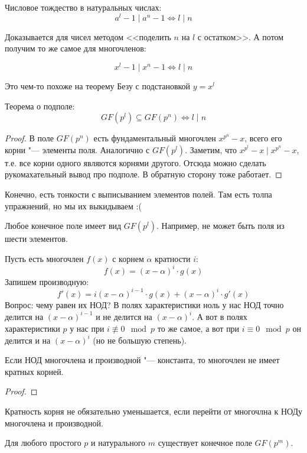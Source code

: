 \begin{lemma}
	Числовое тождество в натуральных числах:
	\[
	a^l - 1 \mid a^n - 1 \iff l \mid n
	\]
\end{lemma}
Доказывается для чисел методом <<поделить $n$ на $l$ с остатком>>.
А потом получим то же самое для многочленов:
\begin{lemma}
	\[
	x^l - 1 \mid x^n - 1 \iff l \mid n
	\]
\end{lemma}
\begin{Rem}
	Это чем-то похоже на теорему Безу с подстановкой $y=x^l$
\end{Rem}

\begin{theorem}
	Теорема о подполе:
	\[
	GF(p^l) \subseteq GF(p^n) \iff l \mid n
	\]
\end{theorem}
\begin{proof}
В поле $GF(p^n)$ есть фундаментальный многочлен $x^{p^n}-x$,
всего его корни "--- элементы поля.
Аналогично с $GF(p^l)$.
Заметим, что $x^{p^l}-x \mid x^{p^n}-x$, т.е. все корни
одного являются корнями другого.
Отсюда можно сделать рукомахательный вывод про подполе.
В обратную сторону тоже работает.
\end{proof}
\begin{Rem}
Конечно, есть тонкости с выписыванием элементов полей.
Там есть толпа упражнений, но мы их выкидываем :(
\end{Rem}

\begin{lemma}
	Любое конечное поле имеет вид $GF(p^l)$.
	Например, не может быть поля из шести элементов.
\end{lemma}

Пусть есть многочлен $f(x)$ с корнем $\alpha$ кратности $i$:
\[
	f(x) = (x - \alpha)^i \cdot g(x)
\]
Запишем производную:
\[
	f'(x) = i(x - \alpha)^{i-1} \cdot g(x) + (x - \alpha)^i \cdot g'(x)
\]
Вопрос: чему равен их НОД?
В полях характеристики ноль у нас НОД точно делится на $(x-\alpha)^{i-1}$ и не делится на $(x-\alpha)^i$.
А вот в полях характеристики $p$ у нас при $i \nequiv 0 \mod p$
то же самое, а вот при $i \equiv 0 \mod p$ он делится и на $(x-\alpha)^i$
(но не большую степень).
\begin{conseq}
	Если НОД многочлена и производной "--- константа, то многочлен не имеет кратных корней.
\end{conseq}
\begin{proof}
	\TODO
\end{proof}
\begin{Rem}
	Кратность корня не обязательно уменьшается, если перейти от многочлна к НОДу многочлена и производной.
\end{Rem}
\begin{theorem}
	Для любого простого $p$ и натурального $m$
	существует конечное поле $GF(p^m)$.
\end{theorem}


